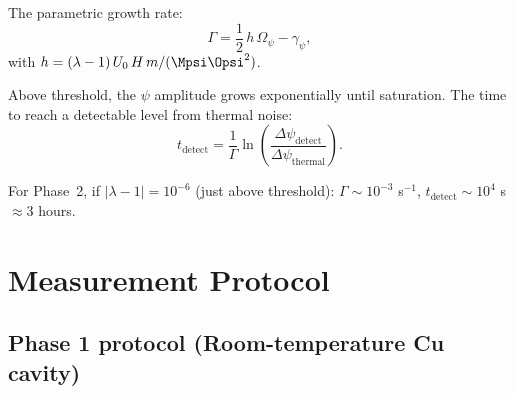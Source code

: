 \documentclass[12pt,letterpaper]{article}
\begin{document}
The parametric growth rate:
\begin{equation}
  \Gamma = \frac{1}{2}\,h\,\Omega_\psi - \gamma_\psi,
\end{equation}
with $h = (\lambda - 1)\,U_0\,H\,m/(\Mpsi\Opsi^2)$.

Above threshold, the $\psi$ amplitude grows exponentially until
saturation.  The time to reach a detectable level from thermal noise:
\begin{equation}
  t_{\text{detect}} = \frac{1}{\Gamma}\ln\!\left(
    \frac{\Delta\psi_{\text{detect}}}{\Delta\psi_{\text{thermal}}}
  \right).
\end{equation}

For Phase~2, if $|\lambda - 1| = 10^{-6}$ (just above threshold):
$\Gamma \sim 10^{-3}$ s$^{-1}$, $t_{\text{detect}} \sim 10^4$ s
$\approx 3$ hours.

\section{Measurement Protocol}

\subsection{Phase 1 protocol (Room-temperature Cu cavity)}
\end{document}
